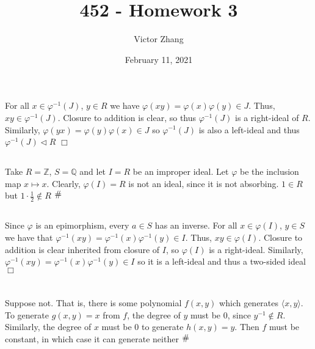 \documentclass{article}
\title{452 - Homework 3}
\author{Victor Zhang}
\date{February 11, 2021}
\newcommand{\contra}{\raisebox{\depth}{\#}}
\begin{document}
\maketitle

\section{}
\subsection{}
For all $x \in \varphi^{-1}(J)$, $y \in R$ we have $\varphi(xy) = \varphi(x)\varphi(y) \in J$. Thus, $xy \in \varphi^{-1}(J)$. Closure to addition is clear, so thus $\varphi^{-1}(J)$ is a right-ideal of $R$. Similarly, $\varphi(yx) = \varphi(y)\varphi(x) \in J$ so $\varphi^{-1}(J)$ is also a left-ideal and thus $\varphi^{-1}(J) \lhd R$ $\Box$
\subsection{}
Take $R = \mathbb{Z}$, $S = \mathbb{Q}$ and let $I = R$ be an improper ideal. Let $\varphi$ be the inclusion map $x \mapsto x$. Clearly, $\varphi(I) = R$ is not an ideal, since it is not absorbing. $1 \in R$ but $1\cdot \frac{1}{2} \notin R$ $\contra$
\subsection{}
Since $\varphi$ is an epimorphism, every $a \in S$ has an inverse. For all $x \in \varphi(I)$, $y \in S$ we have that $\varphi^{-1}(xy) = \varphi^{-1}(x)\varphi^{-1}(y) \in I$. Thus, $xy \in \varphi(I)$. Closure to addition is clear inherited from closure of $I$, so $\varphi(I)$ is a right-ideal. Similarly, $\varphi^{-1}(xy) = \varphi^{-1}(x)\varphi^{-1}(y) \in I$ so it is a left-ideal and thus a two-sided ideal $\Box$

\section{}
Suppose not. That is, there is some polynomial $f(x,y)$ which generates $\langle x,y \rangle$. To generate $g(x,y) = x$ from $f$, the degree of $y$ must be 0, since $y^{-1} \notin R$. Similarly, the degree of $x$ must be 0 to generate $h(x,y) = y$. Then $f$ must be constant, in which case it can generate neither $\contra$
\end{document}
